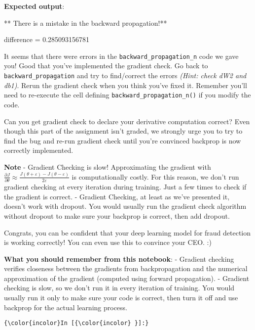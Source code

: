 \documentclass[11pt]{article}
\begin{document}
    \textbf{Expected output}:

** There is a mistake in the backward propagation!**

difference = 0.285093156781

    It seems that there were errors in the \texttt{backward\_propagation\_n}
code we gave you! Good that you've implemented the gradient check. Go
back to \texttt{backward\_propagation} and try to find/correct the
errors \emph{(Hint: check dW2 and db1)}. Rerun the gradient check when
you think you've fixed it. Remember you'll need to re-execute the cell
defining \texttt{backward\_propagation\_n()} if you modify the code.

Can you get gradient check to declare your derivative computation
correct? Even though this part of the assignment isn't graded, we
strongly urge you to try to find the bug and re-run gradient check until
you're convinced backprop is now correctly implemented.

\textbf{Note} - Gradient Checking is slow! Approximating the gradient
with
$\frac{\partial J}{\partial \theta} \approx  \frac{J(\theta + \varepsilon) - J(\theta - \varepsilon)}{2 \varepsilon}$
is computationally costly. For this reason, we don't run gradient
checking at every iteration during training. Just a few times to check
if the gradient is correct. - Gradient Checking, at least as we've
presented it, doesn't work with dropout. You would usually run the
gradient check algorithm without dropout to make sure your backprop is
correct, then add dropout.

Congrats, you can be confident that your deep learning model for fraud
detection is working correctly! You can even use this to convince your
CEO. :)

 \textbf{What you should remember from this notebook}: - Gradient
checking verifies closeness between the gradients from backpropagation
and the numerical approximation of the gradient (computed using forward
propagation). - Gradient checking is slow, so we don't run it in every
iteration of training. You would usually run it only to make sure your
code is correct, then turn it off and use backprop for the actual
learning process.

    \begin{Verbatim}[commandchars=\\\{\}]
{\color{incolor}In [{\color{incolor} }]:} 
\end{Verbatim}


    
    
    
    
\end{document}
